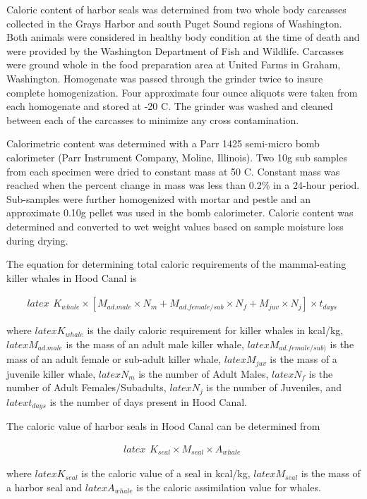 Caloric content of harbor seals was determined from two whole body
carcasses collected in the Grays Harbor and south Puget Sound regions of
Washington. Both animals were considered in healthy body condition at
the time of death and were provided by the Washington Department of Fish
and Wildlife. Carcasses were ground whole in the food preparation area
at United Farms in Graham, Washington. Homogenate was passed through the
grinder twice to insure complete homogenization. Four approximate four
ounce aliquots were taken from each homogenate and stored at -20 C. The
grinder was washed and cleaned between each of the carcasses to minimize
any cross contamination.

Calorimetric content was determined with a Parr 1425 semi-micro bomb
calorimeter (Parr Instrument Company, Moline, Illinois). Two 10g sub
samples from each specimen were dried to constant mass at 50 C. Constant
mass was reached when the percent change in mass was less than 0.2\% in
a 24-hour period. Sub-samples were further homogenized with mortar and
pestle and an approximate 0.10g pellet was used in the bomb calorimeter.
Caloric content was determined and converted to wet weight values based
on sample moisture loss during drying.

The equation for determining total caloric requirements of the
mammal-eating killer whales in Hood Canal is

\[latex
  \begin{aligned}
  K_{whale} \times [M_{ad.male} \times N_{m} + M_{ad.female/sub} \times N_{f} + M_{juv} \times N_{j}] \times t_{days}
  \end{aligned}
\]

where $latex K_{whale}$ is the daily caloric requirement for killer
whales in kcal/kg, $latex M_{ad.male}$ is the mass of an adult male
killer whale, $latex M_{ad.female/sub)}$ is the mass of an adult female
or sub-adult killer whale, $latex M_{juv}$ is the mass of a juvenile
killer whale, $latex N_{m}$ is the number of Adult Males, $latex N_{f}$
is the number of Adult Females/Subadults, $latex N_{j}$ is the number of
Juveniles, and $latex t_{days}$ is the number of days present in Hood
Canal.

The caloric value of harbor seals in Hood Canal can be determined from

\[latex
    \begin{aligned}
    K_{seal} \times M_{seal} \times A_{whale}
    \end{aligned}
\]

where $latex K_{seal}$ is the caloric value of a seal in kcal/kg,
$latex M_{seal}$ is the mass of a harbor seal and $latex A_{whale}$ is
the caloric assimilation value for whales.

